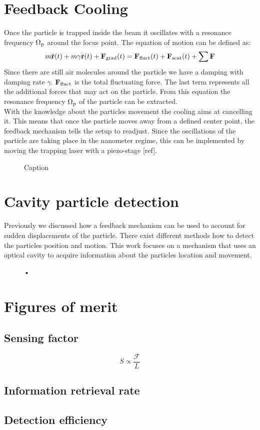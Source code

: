 \section{Feedback Cooling}
Once the particle is trapped inside the beam it oscillates with a resonance frequency $\de{\Omega}{p}$ around the focus point. The equation of motion can be defined as:
\begin{equation}
	m\ddot{\vc{r}}(t)+m\gamma\dot{\vc{r}}(t)+\field{F}{grad}(t)=\field{F}{fluct}(t)+\field{F}{scat}(t)+\sum\limits\vc{F}
\end{equation}
Since there are still air molecules around the particle we have a damping with damping rate $\gamma$. $\field{F}{fluct}$ is the total fluctuating force. The last term represents all the additional forces that may act on the particle. From this equation the resonance frequency $\de{\Omega}{p}$ of the particle can be extracted.\\
With the knowledge about the particles movement the cooling aims at cancelling it. This means that once the particle moves away from a defined center point, the feedback mechanism tells the setup to readjust. Since the oscillations of the particle are taking place in the nanometer regime, this can be implemented by moving the trapping laser with a piezo-stage [ref].
\begin{figure}[H]
    
    \caption{Caption}
    \label{fig:PiezoCooling}
\end{figure}

\section{Cavity particle detection}
Previously we discussed how a feedback mechanism can be used to account for sudden displacements of the particle. There exist different methods how to detect the particles position and motion. This work focuses on a mechanism that uses an optical cavity to acquire information about the particles location and movement.\\
\begin{figure}[H]
	
	\caption{•}
\end{figure}


\section{Figures of merit}

\subsection{Sensing factor}\label{ChapSensingFactor}
\begin{equation}\label{EqSensingFactor}
	S\propto\frac{\mathcal{F}}{L}
\end{equation}

\subsection{Information retrieval rate}\label{ChapInformationRetrievalRate}

\subsection{Detection efficiency}
